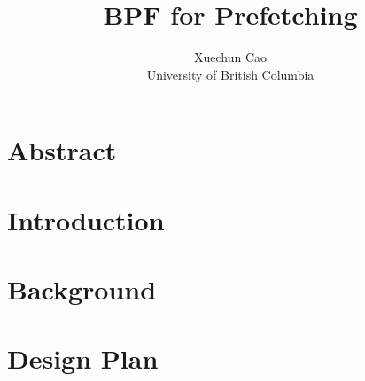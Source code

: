 \documentclass[10pt, twocolumn, letterpaper]{article}
\begin{document}

\date{}

\title{\Large \bf BPF for Prefetching}



\author{
{\rm Xuechun Cao}\\
University of British Columbia\\
} %

\maketitle


\section{Abstract}
\label{sec:abstract}


\section{Introduction}
\label{sec:introduction}


\section{Background}
\label{sec:background}


\section{Design Plan}
\label{sec:design}

\end{document}
